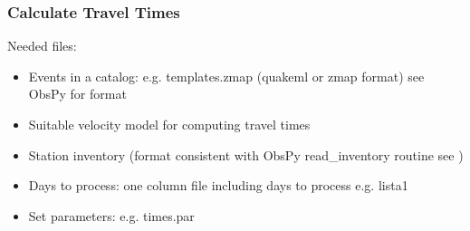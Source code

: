 \documentclass[a4paper,10pt,english]{sphinxmanual}
\begin{document}
\subsubsection{Calculate Travel Times}
\label{\detokenize{sub/input.calculate_ttimes:calculate-travel-times}}\label{\detokenize{sub/input.calculate_ttimes::doc}}
Needed files:
\begin{itemize}
\item {} 
Events in a catalog: e.g. templates.zmap (quakeml or zmap format) see ObsPy for format

\item {} 
Suitable velocity model for computing travel times

\item {} 
Station inventory (format consistent with ObsPy read\_inventory routine see )

\item {} 
Days to process: one column file including days to process e.g. lista1

\item {} 
Set parameters: e.g. times.par

\end{itemize}
\end{document}
